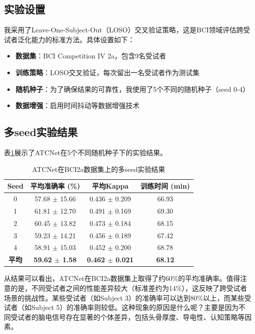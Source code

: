 \documentclass[12pt,a4paper]{ctexart}
\begin{document}
\subsection{实验设置}

我采用了Leave-One-Subject-Out（LOSO）交叉验证策略，这是BCI领域评估跨受试者泛化能力的标准方法。具体设置如下：

\begin{itemize}
    \item \textbf{数据集}：BCI Competition IV 2a，包含9名受试者
    \item \textbf{训练策略}：LOSO交叉验证，每次留出一名受试者作为测试集
    \item \textbf{随机种子}：为了确保结果的可靠性，我使用了5个不同的随机种子（seed 0-4）
    \item \textbf{数据增强}：启用时间抖动等数据增强技术
\end{itemize}

\subsection{多seed实验结果}

表\ref{tab:atcnet_results}展示了ATCNet在5个不同随机种子下的实验结果。

\begin{table}[H]
\centering
\caption{ATCNet在BCI2a数据集上的多seed实验结果}
\label{tab:atcnet_results}
\begin{tabular}{cccc}
\toprule
\textbf{Seed} & \textbf{平均准确率 (\%)} & \textbf{平均Kappa} & \textbf{训练时间 (min)} \\
\midrule
0 & 57.68 $\pm$ 15.66 & 0.436 $\pm$ 0.209 & 66.93 \\
1 & 61.81 $\pm$ 12.70 & 0.491 $\pm$ 0.169 & 69.30 \\
2 & 60.45 $\pm$ 13.82 & 0.473 $\pm$ 0.184 & 68.15 \\
3 & 59.23 $\pm$ 14.21 & 0.456 $\pm$ 0.189 & 67.42 \\
4 & 58.91 $\pm$ 15.03 & 0.452 $\pm$ 0.200 & 68.78 \\
\midrule
\textbf{平均} & \textbf{59.62 $\pm$ 1.58} & \textbf{0.462 $\pm$ 0.021} & \textbf{68.12} \\
\bottomrule
\end{tabular}
\end{table}

从结果可以看出，ATCNet在BCI2a数据集上取得了约60\%的平均准确率。值得注意的是，不同受试者之间的性能差异较大（标准差约为14\%），这反映了跨受试者场景的挑战性。某些受试者（如Subject 3）的准确率可以达到80\%以上，而某些受试者（如Subject 5）的准确率则较低。这种现象的原因是什么呢？主要是因为不同受试者的脑电信号存在显著的个体差异，包括头骨厚度、导电性、认知策略等因素。
\end{document}

